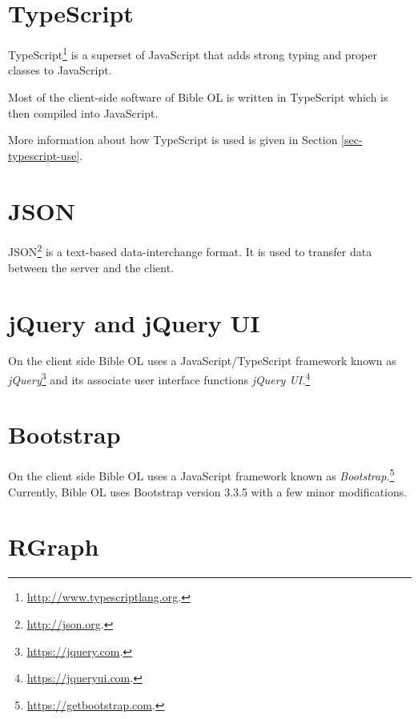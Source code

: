 \documentclass[11pt,oneside,a4paper]{memoir}
\begin{document}
\section{TypeScript}\label{sec-typescript}

TypeScript\footnote{\url{http://www.typescriptlang.org}.} is a superset of JavaScript that adds
strong typing and proper classes to JavaScript.

Most of the client-side software of Bible OL is written in TypeScript which is then compiled into
JavaScript.

More information about how TypeScript is used is given in Section
\ref{sec-typescript-use}.

\section{JSON}

JSON\footnote{\url{http://json.org}.} is a text-based data-interchange format. It is used to
transfer data between the server and the client.

\section{jQuery and jQuery UI}

On the client side Bible OL uses a JavaScript/TypeScript framework known as
\emph{jQuery}\footnote{\url{https://jquery.com}.} and its associate user interface functions
\emph{jQuery UI.}\footnote{\url{https://jqueryui.com}.}

\section{Bootstrap}

On the client side Bible OL uses a JavaScript framework known as
\emph{Bootstrap.}\footnote{\url{https://getbootstrap.com}.} Currently, Bible OL uses Bootstrap
version 3.3.5 with a few minor modifications.

\section{RGraph}
\end{document}
